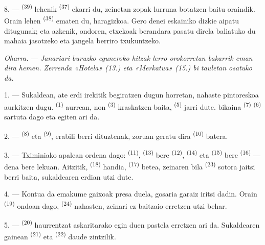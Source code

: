 8. ---  \textsuperscript{(39)} lehenik 
\textsuperscript{(37)} ekarri du, zeinetan zopak lurruna botatzen baitu oraindik.
Orain lehen  \textsuperscript{(38)} ematen du, haragizkoa. Gero
denei eskainiko dizkie aipatu ditugunak; eta azkenik, 
ondoren, etxekoak berandara pasatu direla baliatuko du mahaia jasotzeko eta
jangela berriro txukuntzeko.

\textit{Oharra.} --- \textit{Janariari buruzko eguneroko hitzak lerro
orokorretan bakarrik eman dira hemen. Zerrenda «Hotela» (13.) eta «Merkatua»
(15.) bi tauletan osatuko da.}

\VUsaut{4.6mm}
\VUsaut{3.0mm}

1. --- Sukaldean, ate erdi irekitik begiratzen dugun horretan, nahaste
pintoreskoa aurkitzen dugu.  \textsuperscript{(1)} aurrean,
non  \textsuperscript{(3)} kraskatzen baita, 
\textsuperscript{(5)} jarri dute.  bikaina
\textsuperscript{(7)}  \textsuperscript{(6)} sartuta dago eta
egiten ari da.

2. ---  \textsuperscript{(8)} eta 
\textsuperscript{(9)}, erabili berri dituztenak, zoruan geratu dira
 \textsuperscript{(10)} batera.

3. --- Tximiniako apalean ordena dago:  \textsuperscript{(11)},
 \textsuperscript{(13)} bere 
\textsuperscript{(12)},  \textsuperscript{(14)} eta
 \textsuperscript{(15)} bere 
\textsuperscript{(16)} --- dena bere lekuan. Aitzitik, 
\textsuperscript{(18)} handia,  \textsuperscript{(17)} betea,
zeinaren bila  \textsuperscript{(23)} sotora jaitsi berri
baita, sukaldearen erdian utzi dute.

4. --- Kontua da emakume gaixoak presa duela, gosaria garaiz iritsi dadin. Orain
 \textsuperscript{(19)} ondoan dago, 
\textsuperscript{(24)} nahasten, zeinari ez baitzaio erretzen utzi behar.

5. ---  \textsuperscript{(20)} haurrentzat askaritarako egin duen
pastela erretzen ari da. Sukaldearen gainean 
\textsuperscript{(21)} eta  \textsuperscript{(22)} daude
zintzilik.

